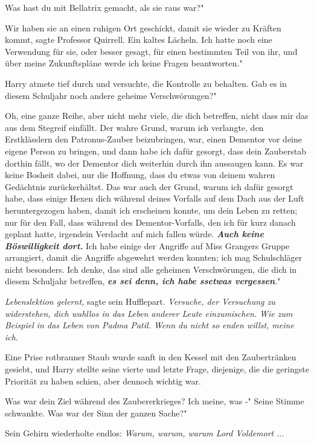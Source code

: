 \glqq{}Was hast du mit Bellatrix gemacht, als sie raus war?"

\glqq{}Wir haben sie an einen ruhigen Ort geschickt, damit sie wieder zu Kräften
kommt\grqq{}, sagte Professor Quirrell. Ein kaltes Lächeln. \glqq{}Ich hatte noch
eine Verwendung für sie, oder besser gesagt, für einen bestimmten Teil von ihr,
und über meine Zukunftspläne werde ich keine Fragen beantworten."

Harry atmete tief durch und versuchte, die Kontrolle zu behalten. \glqq{}Gab es
in diesem Schuljahr noch andere geheime Verschwörungen?"

\glqq{}Oh, eine ganze Reihe, aber nicht mehr viele, die dich betreffen, nicht
dass mir das aus dem Stegreif einfällt. Der wahre Grund, warum ich verlangte,
den Erstklässlern den Patronus-Zauber beizubringen, war, einen Dementor vor
deine eigene Person zu bringen, und dann habe ich dafür gesorgt, dass dein
Zauberstab dorthin fällt, wo der Dementor dich weiterhin durch ihn aussaugen
kann. Es war keine Bosheit dabei, nur die Hoffnung, dass du etwas von deinem
wahren Gedächtnis zurückerhältst. Das war auch der Grund, warum ich dafür
gesorgt habe, dass einige Hexen dich während deines Vorfalls auf dem Dach aus
der Luft heruntergezogen haben, damit ich erscheinen konnte, um dein Leben zu
retten; nur für den Fall, dass während des Dementor-Vorfalls, den ich für kurz
danach geplant hatte, irgendein Verdacht auf mich fallen würde.
\textbf{\emph{Auch keine Böswilligkeit dort.}} Ich habe einige der Angriffe auf
Miss Grangers Gruppe arrangiert, damit die Angriffe abgewehrt werden konnten;
ich mag Schulschläger nicht besonders. Ich denke, das sind alle geheimen
Verschwörungen, die dich in diesem Schuljahr betreffen, \textbf{\emph{es sei
denn, ich habe ssetwas vergessen}}."

\emph{Lebenslektion gelernt,} sagte sein Hufflepart. \emph{Versuche, der
Versuchung zu widerstehen, dich wahllos in das Leben anderer Leute einzumischen.
Wie zum Beispiel in das Leben von Padma Patil. Wenn du nicht so enden willst,
meine ich}.

Eine Prise rotbrauner Staub wurde sanft in den Kessel mit den Zaubertränken
gesiebt, und Harry stellte seine vierte und letzte Frage, diejenige, die die
geringste Priorität zu haben schien, aber dennoch wichtig war.

\glqq{}Was war dein Ziel während des Zaubererkrieges? Ich meine, was -" Seine
Stimme schwankte. \glqq{}Was war der Sinn der ganzen Sache?"

Sein Gehirn wiederholte endlos: \emph{Warum, warum, warum Lord Voldemort .}..

